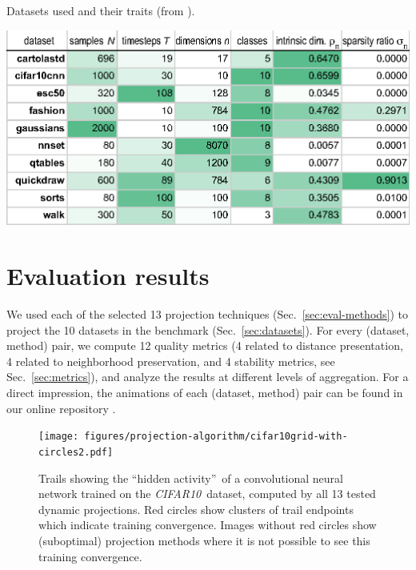 \begin{table}
\centering
\caption{Datasets used and their traits (from \cite{Vernier2020}).}
\label{tab:datasets}
\includegraphics[width=\linewidth]{figures/projection-algorithm/datasets.eps}
\end{table}
  
\section{Evaluation results}
\label{sec:results}
%
We used each of the selected 13 projection techniques (Sec.~\ref{sec:eval-methods}) to project the 10 datasets in the benchmark (Sec.~\ref{sec:datasets}). For every (dataset, method) pair, we compute 12 quality metrics (4 related to distance presentation, 4 related to neighborhood preservation, and 4 stability metrics, see Sec.~\ref{sec:metrics}), and analyze the results at different levels of aggregation.
For a direct impression, the animations of each (dataset, method) pair can be found in our online repository \cite{repo-guided}.


\begin{figure}[htb!]
  \centering
  \texttt{[image: figures/projection-algorithm/cifar10grid-with-circles2.pdf]}
  \caption{Trails showing the ``hidden activity''\,\cite{Rauber2017} of a convolutional neural network trained on the \emph{CIFAR10}\,\cite{dataset:cifar10} dataset, computed by all 13 tested dynamic projections. Red circles show clusters of trail endpoints which indicate training convergence. Images without red circles show (suboptimal) projection methods where it is not possible to see this training convergence.}  
  \label{fig:cifar}
  \vspace{-0.5cm}
\end{figure}




